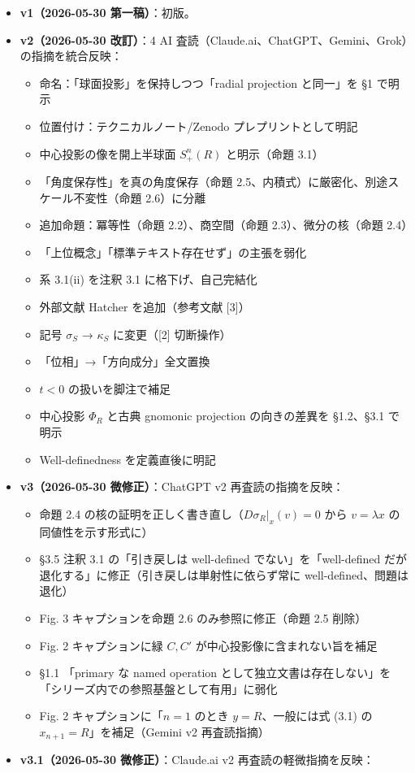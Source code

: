 \documentclass[
]{ltjsarticle}
\providecommand{\tightlist}{%
  \setlength{\itemsep}{0pt}\setlength{\parskip}{0pt}}
\begin{document}
\begin{itemize}
\tightlist
\item
  \textbf{v1（2026-05-30 第一稿）}：初版。
\item
  \textbf{v2（2026-05-30 改訂）}：4 AI
  査読（Claude.ai、ChatGPT、Gemini、Grok）の指摘を統合反映：

  \begin{itemize}
  \tightlist
  \item
    命名：「球面投影」を保持しつつ「radial projection と同一」を §1
    で明示
  \item
    位置付け：テクニカルノート/Zenodo プレプリントとして明記
  \item
    中心投影の像を開上半球面 \(S^n_+(R)\) と明示（命題 3.1）
  \item
    「角度保存性」を真の角度保存（命題
    2.5、内積式）に厳密化、別途スケール不変性（命題 2.6）に分離
  \item
    追加命題：冪等性（命題 2.2）、商空間（命題 2.3）、微分の核（命題
    2.4）
  \item
    「上位概念」「標準テキスト存在せず」の主張を弱化
  \item
    系 3.1(ii) を注釈 3.1 に格下げ、自己完結化
  \item
    外部文献 Hatcher を追加（参考文献 {[}3{]}）
  \item
    記号 \(\sigma_S\) → \(\kappa_S\) に変更（{[}2{]} 切断操作）
  \item
    「位相」→「方向成分」全文置換
  \item
    \(t<0\) の扱いを脚注で補足
  \item
    中心投影 \(\Phi_R\) と古典 gnomonic projection の向きの差異を
    §1.2、§3.1 で明示
  \item
    Well-definedness を定義直後に明記
  \end{itemize}
\item
  \textbf{v3（2026-05-30 微修正）}：ChatGPT v2 再査読の指摘を反映：

  \begin{itemize}
  \tightlist
  \item
    命題 2.4 の核の証明を正しく書き直し（\(D\sigma_R|_x(v)=0\) から
    \(v=\lambda x\) の同値性を示す形式に）
  \item
    §3.5 注釈 3.1 の「引き戻しは well-defined でない」を「well-defined
    だが退化する」に修正（引き戻しは単射性に依らず常に
    well-defined、問題は退化）
  \item
    Fig. 3 キャプションを命題 2.6 のみ参照に修正（命題 2.5 削除）
  \item
    Fig. 2 キャプションに緑 \(C, C'\) が中心投影像に含まれない旨を補足
  \item
    §1.1 「primary な named operation
    として独立文書は存在しない」を「シリーズ内での参照基盤として有用」に弱化
  \item
    Fig. 2 キャプションに「\(n=1\) のとき \(y = R\)、一般には式 (3.1) の
    \(x_{n+1} = R\)」を補足（Gemini v2 再査読指摘）
  \end{itemize}
\item
  \textbf{v3.1（2026-05-30 微修正）}：Claude.ai v2
  再査読の軽微指摘を反映：


\end{itemize}
\end{document}
